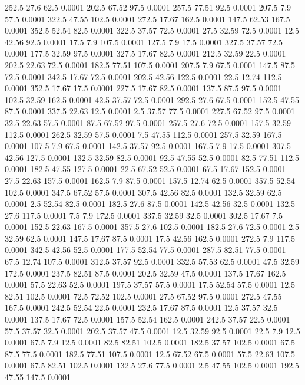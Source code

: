 252.5	27.6	62.5	0.0001
202.5	67.52	97.5	0.0001
257.5	77.51	92.5	0.0001
207.5	7.9	57.5	0.0001
322.5	47.55	102.5	0.0001
272.5	17.67	162.5	0.0001
147.5	62.53	167.5	0.0001
352.5	52.54	82.5	0.0001
322.5	37.57	72.5	0.0001
27.5	32.59	72.5	0.0001
12.5	42.56	92.5	0.0001
17.5	7.9	107.5	0.0001
127.5	7.9	17.5	0.0001
327.5	37.57	72.5	0.0001
177.5	32.59	97.5	0.0001
327.5	17.67	82.5	0.0001
212.5	32.59	22.5	0.0001
202.5	22.63	72.5	0.0001
182.5	77.51	107.5	0.0001
207.5	7.9	67.5	0.0001
147.5	87.5	72.5	0.0001
342.5	17.67	72.5	0.0001
202.5	42.56	122.5	0.0001
22.5	12.74	112.5	0.0001
352.5	17.67	17.5	0.0001
227.5	17.67	82.5	0.0001
137.5	87.5	97.5	0.0001
102.5	32.59	162.5	0.0001
42.5	37.57	72.5	0.0001
292.5	27.6	67.5	0.0001
152.5	47.55	87.5	0.0001
337.5	22.63	12.5	0.0001
2.5	37.57	77.5	0.0001
227.5	67.52	97.5	0.0001
32.5	22.63	57.5	0.0001
87.5	67.52	97.5	0.0001
257.5	27.6	72.5	0.0001
157.5	32.59	112.5	0.0001
262.5	32.59	57.5	0.0001
7.5	47.55	112.5	0.0001
257.5	32.59	167.5	0.0001
107.5	7.9	67.5	0.0001
142.5	37.57	92.5	0.0001
167.5	7.9	17.5	0.0001
307.5	42.56	127.5	0.0001
132.5	32.59	82.5	0.0001
92.5	47.55	52.5	0.0001
82.5	77.51	112.5	0.0001
182.5	47.55	127.5	0.0001
22.5	67.52	52.5	0.0001
67.5	17.67	152.5	0.0001
27.5	22.63	157.5	0.0001
162.5	7.9	87.5	0.0001
157.5	12.74	62.5	0.0001
357.5	52.54	102.5	0.0001
347.5	67.52	57.5	0.0001
307.5	42.56	82.5	0.0001
132.5	32.59	62.5	0.0001
2.5	52.54	82.5	0.0001
182.5	27.6	87.5	0.0001
142.5	42.56	32.5	0.0001
132.5	27.6	117.5	0.0001
7.5	7.9	172.5	0.0001
337.5	32.59	32.5	0.0001
302.5	17.67	7.5	0.0001
152.5	22.63	167.5	0.0001
357.5	27.6	102.5	0.0001
182.5	27.6	72.5	0.0001
2.5	32.59	62.5	0.0001
147.5	17.67	87.5	0.0001
17.5	42.56	162.5	0.0001
272.5	7.9	117.5	0.0001
342.5	42.56	52.5	0.0001
177.5	52.54	77.5	0.0001
287.5	82.51	77.5	0.0001
67.5	12.74	107.5	0.0001
312.5	37.57	92.5	0.0001
332.5	57.53	62.5	0.0001
47.5	32.59	172.5	0.0001
237.5	82.51	87.5	0.0001
202.5	32.59	47.5	0.0001
137.5	17.67	162.5	0.0001
57.5	22.63	52.5	0.0001
197.5	37.57	57.5	0.0001
17.5	52.54	57.5	0.0001
12.5	82.51	102.5	0.0001
72.5	72.52	102.5	0.0001
27.5	67.52	97.5	0.0001
272.5	47.55	167.5	0.0001
242.5	52.54	22.5	0.0001
232.5	17.67	87.5	0.0001
12.5	37.57	32.5	0.0001
137.5	17.67	72.5	0.0001
157.5	52.54	162.5	0.0001
242.5	37.57	22.5	0.0001
57.5	37.57	32.5	0.0001
202.5	37.57	47.5	0.0001
12.5	32.59	92.5	0.0001
22.5	7.9	12.5	0.0001
67.5	7.9	12.5	0.0001
82.5	82.51	102.5	0.0001
182.5	37.57	102.5	0.0001
67.5	87.5	77.5	0.0001
182.5	77.51	107.5	0.0001
12.5	67.52	67.5	0.0001
57.5	22.63	107.5	0.0001
67.5	82.51	102.5	0.0001
132.5	27.6	77.5	0.0001
2.5	47.55	102.5	0.0001
192.5	47.55	147.5	0.0001
